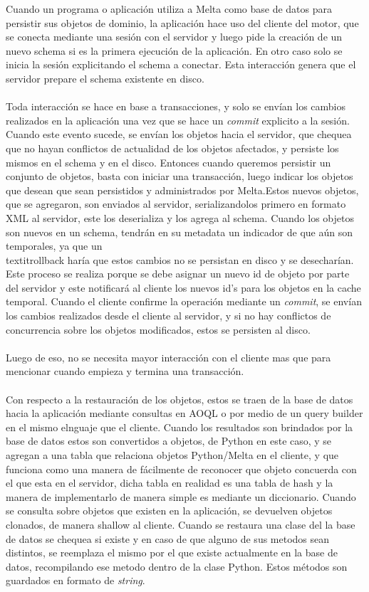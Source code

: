 \documentclass{melta}
\begin{document}
Cuando un programa o aplicación utiliza a Melta como base de datos para persistir sus objetos de dominio, la aplicación hace uso del cliente del motor, que se conecta mediante una sesión con el servidor y luego pide la creación de un nuevo schema si es la primera ejecución de la aplicación. En otro caso solo se inicia la sesión explicitando el schema a conectar. Esta interacción genera que el servidor prepare el schema existente en disco.
\\\\
Toda interacción se hace en base a transacciones, y solo se envían los cambios realizados en la aplicación una vez que se hace un \textit{commit} explicito a la sesión. Cuando este evento sucede, se envían los objetos hacia el servidor, que chequea que no hayan conflictos de actualidad de los objetos afectados, y persiste los mismos en el schema y en el disco. 
Entonces cuando queremos persistir un conjunto de objetos, basta con iniciar una transacción, luego indicar los objetos que desean que sean persistidos y administrados por Melta.Estos nuevos objetos, que se agregaron, son enviados al servidor, serializandolos primero en formato XML al servidor, este los deserializa y los agrega al schema. Cuando los objetos son nuevos en un schema, tendrán en su metadata un indicador de que aún son temporales, ya que un \\textit{rollback} haría que estos cambios no se persistan en disco y se desecharían. Este proceso se realiza porque se debe asignar un nuevo id de objeto por parte del servidor y este notificará al cliente los nuevos id's para los objetos en la cache temporal. Cuando el cliente confirme la operación mediante un \textit{commit}, se envían los cambios realizados desde el cliente al servidor, y si no hay conflictos de concurrencia sobre los objetos modificados, estos se persisten al disco. 
\\\\
Luego de eso, no se necesita mayor interacción con el cliente mas que para mencionar cuando empieza y termina una transacción. 
\\\\
Con respecto a la restauración de los objetos, estos se traen de la base de datos hacia la aplicación mediante consultas en AOQL o por medio de un query builder en el mismo elnguaje que el cliente. Cuando los resultados son brindados por la base de datos estos son convertidos a objetos, de Python en este caso, y se agregan a una tabla que relaciona objetos Python/Melta en el cliente, y que funciona como una manera de fácilmente de reconocer que objeto concuerda con el que esta en el servidor, dicha tabla en realidad es una tabla de hash y la manera de implementarlo de manera simple es mediante un diccionario. Cuando se consulta sobre objetos que existen en la aplicación, se devuelven objetos clonados, de manera shallow al cliente. Cuando se restaura una clase del la base de datos se chequea si existe y en caso de que alguno de sus metodos sean distintos, se reemplaza el mismo por el que existe actualmente en la base de datos, recompilando ese metodo dentro de la clase Python. Estos métodos son guardados en formato de \textit{string}. 
\end{document}
